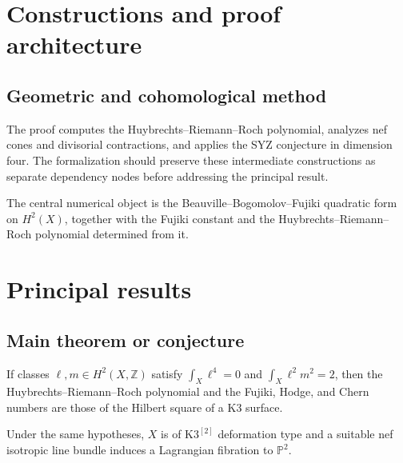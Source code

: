 \chapter{Constructions and proof architecture}
\label{chap:riemann-roch-polynomials-hyperkahler-fourfolds-method}

\section{Geometric and cohomological method}
\label{sec:riemann-roch-polynomials-hyperkahler-fourfolds-method}

The proof computes the Huybrechts--Riemann--Roch polynomial, analyzes nef cones and divisorial contractions, and applies the SYZ conjecture in dimension four. The formalization should preserve these intermediate constructions
as separate dependency nodes before addressing the principal result.

\begin{definition}
\label{riemann-roch-polynomials-hyperkahler-fourfolds-central-object}
The central numerical object is the Beauville--Bogomolov--Fujiki quadratic form on $H^2(X)$, together with the Fujiki constant and the Huybrechts--Riemann--Roch polynomial determined from it.
\notready
\end{definition}

\chapter{Principal results}
\label{chap:riemann-roch-polynomials-hyperkahler-fourfolds-results}

\section{Main theorem or conjecture}
\label{sec:riemann-roch-polynomials-hyperkahler-fourfolds-results}

\begin{theorem}
\label{riemann-roch-polynomials-hyperkahler-fourfolds-main}
If classes $\ell,m\in H^2(X,\mathbb Z)$ satisfy $\int_X\ell^4=0$ and $\int_X\ell^2m^2=2$, then the Huybrechts--Riemann--Roch polynomial and the Fujiki, Hodge, and Chern numbers are those of the Hilbert square of a K3 surface.
\notready
\end{theorem}

\begin{theorem}
\label{riemann-roch-polynomials-hyperkahler-fourfolds-secondary}
Under the same hypotheses, $X$ is of $\mathrm{K3}^{[2]}$ deformation type and a suitable nef isotropic line bundle induces a Lagrangian fibration to $\mathbb P^2$.
\notready
\end{theorem}
